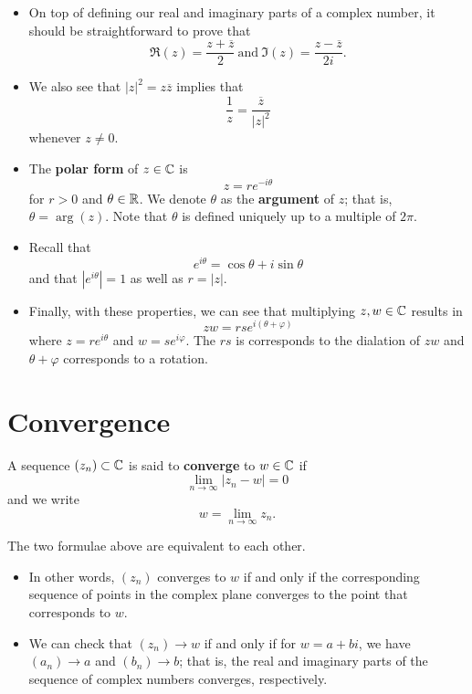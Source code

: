 \documentclass[11pt,a4paper]{book}
\begin{document}
\begin{itemize}
    \item On top of defining our real and imaginary parts of a complex number, it should be straightforward to prove that
        \[  \Re(z) = \frac{ z  + \overline{z} }{ 2  }  \ \text{and} \ \Im(z) = \frac{  z - \overline{z} }{ 2i }. \]
    \item We also see that \( | z |^{2} = z \overline{z} \) implies that
        \[  \frac{ 1 }{ z }  = \frac{ \overline{z} }{ | z |^{2} }  \]
        whenever \( z \neq 0  \).
    \item The \textbf{polar form} of \( z \in \mathbb{C}  \) is 
        \[  z = r e^{-i \theta} \]
        for \( r > 0  \) and \( \theta \in \mathbb{R}  \). We denote \( \theta  \) as the \textbf{argument} of \( z  \); that is, \( \theta = \arg(z) \). Note that \( \theta \) is defined uniquely up to a multiple of \( 2\pi \).
    \item Recall that
        \[  e^{i \theta} = \cos \theta + i \sin \theta \]
        and that \( | e^{i\theta} |  = 1  \) as well as \( r = | z  |  \).
    \item Finally, with these properties, we can see that multiplying \( z,w \in \mathbb{C}  \) results in
        \[  zw  = rs e^{i (\theta + \varphi)} \]
        where \( z = r e^{i\theta} \) and \( w = s e^{i \varphi} \). The \( rs  \) is corresponds to the dialation of \( zw  \) and \( \theta + \varphi \) corresponds to a rotation.
\end{itemize}

\section{Convergence}

\begin{definition}[Convergence in \( \C \)]
    A sequence \( ({z}_{n}) \subset \mathbb{C} \) is said to \textbf{converge} to \( w \in \mathbb{C}  \) if 
    \[ \lim_{ n \to \infty  }  | {z}_{n} - w  | = 0   \]
    and we write
    \[  w = \lim_{ n \to  \infty  } {z}_{n}. \]
\end{definition}
The two formulae above are equivalent to each other.

\begin{itemize}
    \item In other words, \( ({z}_{n})  \) converges to \( w  \) if and only if the corresponding sequence of points in the complex plane converges to the point that corresponds to \( w \). 
    \item We can check that \( ({z}_{n}) \to w  \) if and only if for \( w = a + bi  \), we have \( ({a}_{n}) \to a  \) and \( ({b}_{n}) \to b  \); that is, the real and imaginary parts of the sequence of complex numbers converges, respectively.
\end{itemize}
\end{document}
